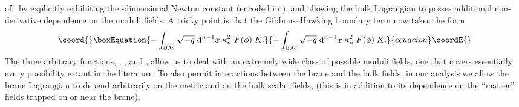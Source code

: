 \documentclass[a4paper,10pt]{article}
\begin{document}
of~\cite{generalized-junction} by explicitly exhibiting the
\coordHE{}-dimensional Newton constant (encoded in \coordHE{}), and allowing the bulk
Lagrangian to posses additional non-derivative dependence on the
moduli fields.  A tricky point is that the Gibbons--Hawking boundary
term now takes the form~\cite{generalized-junction}
%
\begin{equation}\coord{}\boxEquation{
-\int_{\partial\M} \sqrt{-q} \;\d^{n-1}x \;  \kappa_n^{2} \; F(\phi)\;K.
}{
-\int_{\partial\M} \sqrt{-q} \;\d^{n-1}x \;  \kappa_n^{2} \; F(\phi)\;K.
}{ecuacion}\coordE{}\end{equation}
%
The three arbitrary functions, \coordHE{}, \coordHE{}, and \coordHE{},
allow us to deal with an extremely wide class of possible moduli
fields, one that covers essentially every possibility extant in the
literature.  To also permit interactions between the brane and the
bulk fields, in our analysis we allow the brane Lagrangian to depend
arbitrarily on the metric and on the bulk scalar fields, (this is in
addition to its dependence on the ``matter'' fields trapped on or near
the brane).
\end{document}
